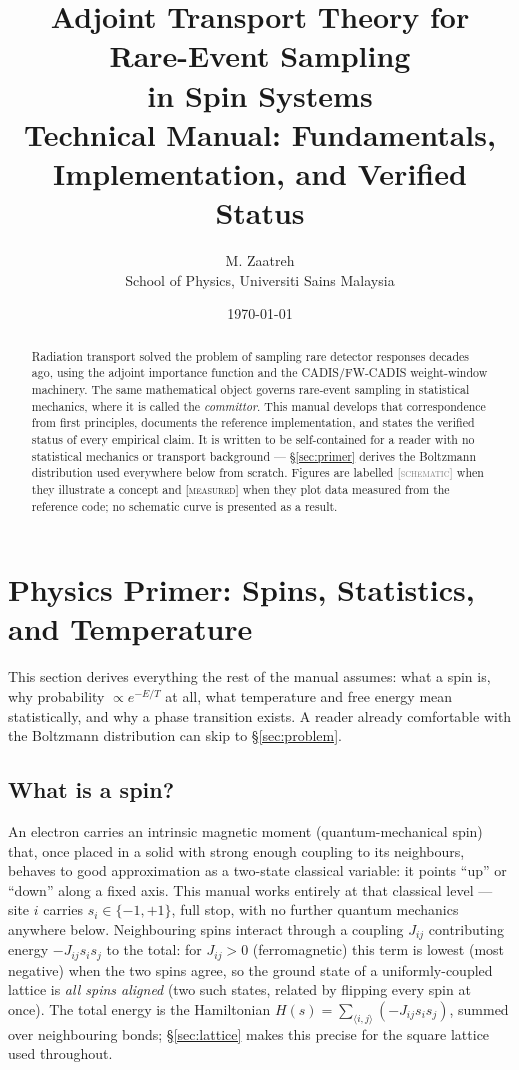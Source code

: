 \documentclass[11pt,a4paper]{article}
\title{\textbf{Adjoint Transport Theory for Rare-Event Sampling\\in Spin Systems}\\[6pt]
\Large Technical Manual: Fundamentals, Implementation, and Verified Status}
\author{M. Zaatreh\\\small School of Physics, Universiti Sains Malaysia}
\date{\today}
\newcommand{\SCHEM}{\textcolor{gray}{\footnotesize[\textsc{schematic}]}}
\newcommand{\MEAS}{\textcolor{blue!60!black}{\footnotesize[\textsc{measured}]}}
\begin{document}
\maketitle

\begin{abstract}
Radiation transport solved the problem of sampling rare detector responses decades ago, using
the adjoint importance function and the CADIS/FW-CADIS weight-window machinery. The same
mathematical object governs rare-event sampling in statistical mechanics, where it is called the
\emph{committor}. This manual develops that correspondence from first principles, documents the
reference implementation, and states the verified status of every empirical claim. It is written to
be self-contained for a reader with no statistical mechanics or transport background ---
\S\ref{sec:primer} derives the Boltzmann distribution used everywhere below from scratch.
Figures are labelled
\SCHEM{} when they illustrate a concept and \MEAS{} when they plot data measured from the
reference code; no schematic curve is presented as a result.
\end{abstract}

\tableofcontents
\clearpage

\section{Physics Primer: Spins, Statistics, and Temperature}\label{sec:primer}

This section derives everything the rest of the manual assumes: what a spin is, why probability
$\propto e^{-E/T}$ at all, what temperature and free energy mean statistically, and why a phase
transition exists. A reader already comfortable with the Boltzmann distribution can skip to
\S\ref{sec:problem}.

\subsection{What is a spin?}
An electron carries an intrinsic magnetic moment (quantum-mechanical spin) that, once placed in a
solid with strong enough coupling to its neighbours, behaves to good approximation as a two-state
classical variable: it points ``up'' or ``down'' along a fixed axis. This manual works entirely
at that classical level --- site $i$ carries $s_i\in\{-1,+1\}$, full stop, with no further
quantum mechanics anywhere below. Neighbouring spins interact through a coupling $J_{ij}$
contributing energy $-J_{ij}s_is_j$ to the total: for $J_{ij}>0$ (ferromagnetic) this term is
lowest (most negative) when the two spins agree, so the ground state of a uniformly-coupled
lattice is \emph{all spins aligned} (two such states, related by flipping every spin at once).
The total energy is the Hamiltonian $H(s)=\sum_{\langle i,j\rangle}(-J_{ij}s_is_j)$, summed over
neighbouring bonds; \S\ref{sec:lattice} makes this precise for the square lattice used
throughout.
\end{document}
